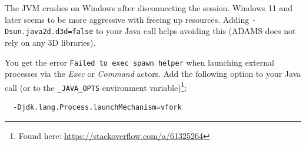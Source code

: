 \begin{tight_itemize}
  \item The JVM crashes on Windows after disconnecting the session. Windows 11 and
  later seems to be more aggressive with freeing up resources. Adding
  \texttt{-Dsun.java2d.d3d=false} to your Java call helps avoiding this (ADAMS does
  not rely on any 3D libraries).

  \item You get the error \texttt{Failed to exec spawn helper} when launching
  external processes via the \textit{Exec} or \textit{Command} actors. Add the
  following option to your Java call (or to the \texttt{\_JAVA\_OPTS} environment
  variable)\footnote{Found here: \url{https://stackoverflow.com/a/61325264}{}}: \
  \begin{verbatim}
  -Djdk.lang.Process.launchMechanism=vfork
  \end{verbatim}

\end{tight_itemize}
